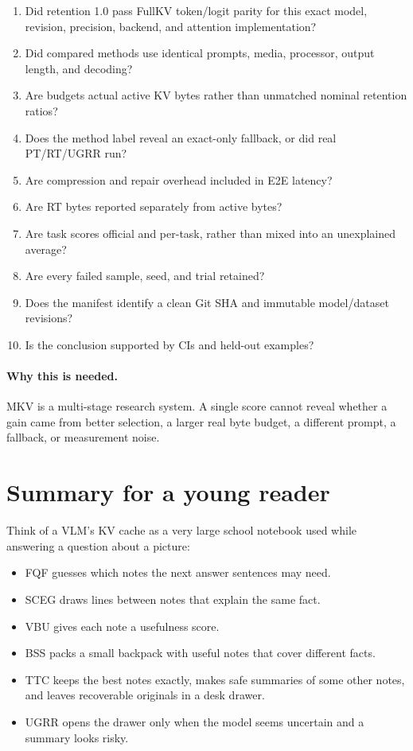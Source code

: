 \documentclass[11pt]{article}
\newcommand{\why}{\paragraph{Why this is needed.}}
\begin{document}
\begin{enumerate}
  \item Did retention 1.0 pass FullKV token/logit parity for this exact model, revision, precision,
        backend, and attention implementation?
  \item Did compared methods use identical prompts, media, processor, output length, and decoding?
  \item Are budgets actual active KV bytes rather than unmatched nominal retention ratios?
  \item Does the method label reveal an exact-only fallback, or did real PT/RT/UGRR run?
  \item Are compression and repair overhead included in E2E latency?
  \item Are RT bytes reported separately from active bytes?
  \item Are task scores official and per-task, rather than mixed into an unexplained average?
  \item Are every failed sample, seed, and trial retained?
  \item Does the manifest identify a clean Git SHA and immutable model/dataset revisions?
  \item Is the conclusion supported by CIs and held-out examples?
\end{enumerate}

\why MKV is a multi-stage research system. A single score cannot reveal whether a gain came from
better selection, a larger real byte budget, a different prompt, a fallback, or measurement noise.

\section{Summary for a young reader}

Think of a VLM's KV cache as a very large school notebook used while answering a question about a
picture:

\begin{itemize}
  \item FQF guesses which notes the next answer sentences may need.
  \item SCEG draws lines between notes that explain the same fact.
  \item VBU gives each note a usefulness score.
  \item BSS packs a small backpack with useful notes that cover different facts.
  \item TTC keeps the best notes exactly, makes safe summaries of some other notes, and leaves
        recoverable originals in a desk drawer.
  \item UGRR opens the drawer only when the model seems uncertain and a summary looks risky.
\end{itemize}
\end{document}
